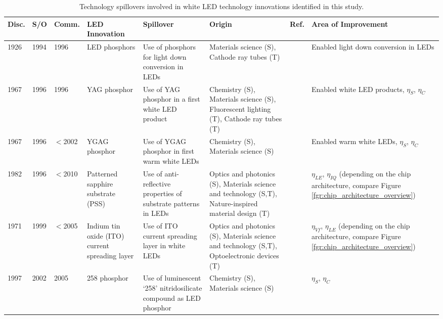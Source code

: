 \documentclass[journal=jacsat,manuscript=article]{achemso}
\begin{document}
\clearpage
\begin{table}[h!]
    \tiny
    \centering
    \caption{Technology spillovers involved in white LED technology innovations identified in this study.}
    \begin{tabularx}{\textwidth}{|l|l|l|X|X|X|l|X|}
    \hline
        \textbf{Disc.} & \textbf{S/O} & \textbf{Comm.} & \textbf{LED Innovation} & \textbf{Spillover} & \textbf{Origin} & \textbf{Ref.} & \textbf{Area of Improvement} \\ \hline
        1926 & 1994 & 1996 & LED phosphors & Use of phosphors for light down conversion in LEDs & Materials science (S), Cathode ray tubes (T) & \cite{bright1972electric,shimizu1994sheet,cho2017white} & Enabled light down conversion in LEDs \\ \hline
        1967 & 1996 & 1996 & YAG phosphor & Use of YAG phosphor in a first white LED product & Chemistry (S), Materials science (S), Fluorescent lighting (T), Cathode ray tubes (T) & \cite{blasse1967new,bando1996,bando1998development,shimizu1999light,cho2017white} & Enabled white LED products, $\eta_S$, $\eta_C$ \\ \hline
        1967 & 1996 & $<$2002 & YGAG phosphor & Use of YGAG phosphor in first warm white LEDs & Chemistry (S), Materials science (S) &\cite{holloway1969optical,bando1998development,shimizu1999light,Mueller2002} & Enabled warm white LEDs, $\eta_S$, $\eta_C$ \\ \hline
        1982 & 1996 & $<$2010 & Patterned sapphire substrate (PSS) & Use of anti-reflective properties of substrate patterns in LEDs & Optics and photonics (S), Materials science and technology (S,T), Nature-inspired material design (T) &\cite{moharam1982diffraction,krames1998ordered,feezell2018invention,Narukawa_2010} & $\eta_{LE}$, $\eta_{IQ}$ (depending on the chip architecture, compare Figure \ref{fgr:chip_architecture_overview})\\ \hline
        1971 & 1999 & $<$2005 & Indium tin oxide (ITO) current spreading layer & Use of ITO current spreading layer in white LEDs & Optics and photonics (S), Materials science and technology (S,T), Optoelectronic devices (T) & \cite{vossen1971rf,fraser1972highly,margalith1999indium} & $\eta_{Vf}$, $\eta_{LE}$ (depending on the chip architecture, compare Figure \ref{fgr:chip_architecture_overview}) \\ \hline
        1997 & 2002 & 2005 & 258 phosphor & Use of luminescent ‘258’ nitridosilicate compound as LED phosphor & Chemistry (S), Materials science (S) &\cite{Huppertz1997,mueller2004phosphor,MuellerMach2005} & $\eta_S$, $\eta_C$ \\ \hline

\end{tabularx}
\end{table}
\end{document}
